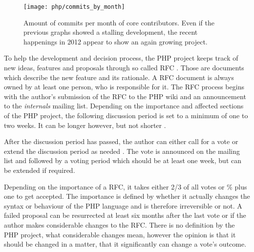 \begin{figure}[htbp]
  \centering
  \texttt{[image: php/commits\_by\_month]}
  \caption[Commits by Month, PHP]
  {Amount of commits per month of core contributors. Even if the previous
    graphs showed a stalling development, the recent happenings in 2012 appear
    to show an again growing project.}
\end{figure}

To help the development and decision process, the PHP project keeps track of
new ideas, features and proposals through so called \ac{RFC} \cite{PHPRFC}.
Those are documents which describe the new feature and its rationale. A
\ac{RFC} document is always owned by at least one person, who is responsible
for it. The \ac{RFC} process begins with the author's submission of the
\ac{RFC} to the PHP wiki and an announcement to the \emph{internals} mailing
list. Depending on the importance and affected sections of the PHP project, the
following discussion period is set to a minimum of one to two weeks. It can be
longer however, but not shorter \cite{PHPVoting}.

After the discussion period has passed, the author can either call for a vote
or extend the discussion period as needed \cite{PHPVoting}. The vote is
announced on the mailing list and followed by a voting period which should be
at least one week, but can be extended if required.

Depending on the importance of a \ac{RFC}, it takes either 2/3 of all votes or
\unit[50]{\%} plus one to get accepted. The importance is defined by whether it
actually changes the syntax or behaviour of the PHP language and is therefore
irreversible or not. A failed proposal can be resurrected at least six months
after the last vote or if the author makes considerable changes to the
\ac{RFC}. There is no definition by the PHP project, what considerable changes
mean, however the opinion is that it should be changed in a matter, that it
significantly can change a vote's outcome.

